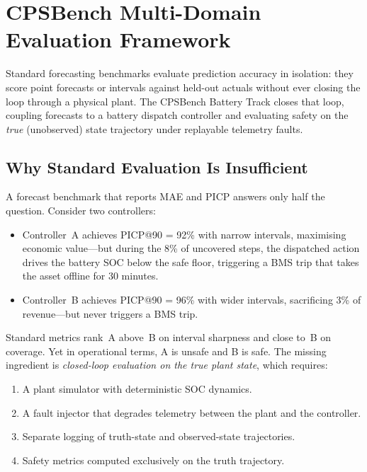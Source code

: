 
\chapter{CPSBench Multi-Domain Evaluation Framework}
\label{ch:cpsbench}

Standard forecasting benchmarks evaluate prediction accuracy in isolation:
they score point forecasts or intervals against held-out actuals without
ever closing the loop through a physical plant.  The CPSBench Battery Track
closes that loop, coupling forecasts to a battery dispatch controller and
evaluating safety on the \emph{true} (unobserved) state trajectory under
replayable telemetry faults.

\section{Why Standard Evaluation Is Insufficient}

A forecast benchmark that reports MAE and PICP answers only half the
question.  Consider two controllers:

\begin{itemize}
  \item Controller~A achieves PICP@90 = 92\% with narrow intervals,
    maximising economic value---but during the 8\% of uncovered steps,
    the dispatched action drives the battery SOC below the safe floor,
    triggering a BMS trip that takes the asset offline for 30 minutes.
  \item Controller~B achieves PICP@90 = 96\% with wider intervals,
    sacrificing 3\% of revenue---but never triggers a BMS trip.
\end{itemize}

Standard metrics rank~A above~B on interval sharpness and close to~B on
coverage.  Yet in operational terms, A is unsafe and B is safe.  The
missing ingredient is \emph{closed-loop evaluation on the true plant
state}, which requires:
\begin{enumerate}
  \item A plant simulator with deterministic SOC dynamics.
  \item A fault injector that degrades telemetry between the plant and the
    controller.
  \item Separate logging of truth-state and observed-state trajectories.
  \item Safety metrics computed exclusively on the truth trajectory.
\end{enumerate}

